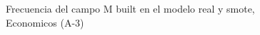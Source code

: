 \begin{figure}[H]
    \centering
    
    \caption{Frecuencia del campo M built en el modelo real y smote, Economicos (A-3)}
    \label{frecuency-M Built-smote-enc}
\end{figure}